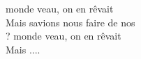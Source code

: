  monde veau, on en rêvait  \\
Mais  savions nous faire de nos \\
 ? monde veau, on en rêvait  \\
Mais .... \color{cyan}{(fade)}